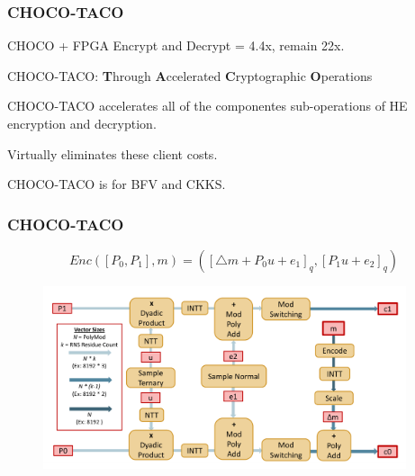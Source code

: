 \documentclass[10pt,handout]{beamer}
\begin{document}


\begin{frame}
\frametitle{CHOCO-TACO}
CHOCO + FPGA Encrypt and Decrypt = 4.4x, remain 22x.

CHOCO-TACO: \textbf{T}hrough \textbf{A}ccelerated \textbf{C}ryptographic \textbf{O}perations

CHOCO-TACO accelerates all of the componentes sub-operations of HE encryption and decryption.

Virtually eliminates these client costs.

CHOCO-TACO is for BFV and CKKS.




\end{frame}


\begin{frame}
\frametitle{CHOCO-TACO}
\begin{equation*}
    Enc([P_0,P_1],m) = ([\triangle m + P_0u+e_1]_q, [P_1u+e_2]_q)
\end{equation*}

\begin{figure}
    \includegraphics[width=0.95\textwidth]{pipeline.png}
\end{figure}



\end{frame}
\end{document}
